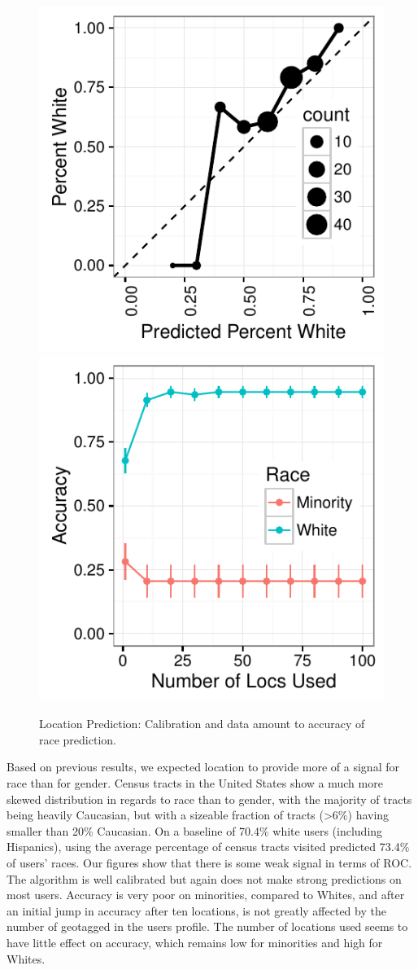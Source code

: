 \begin{figure}
  \centering
    \includegraphics[width=0.48\linewidth]{fig/census/calibration_race_loc-eps-converted-to.pdf}
    \includegraphics[width=0.48\linewidth]{fig/census/locs_v_accuracy_race_labeled-eps-converted-to.pdf}
  \caption{Location Prediction: Calibration and data amount to accuracy of race prediction.\label{fig:accuracy_race_loc}}
\end{figure}

Based on previous results, we expected location to provide more of a signal for race than for gender.
Census tracts in the United States show a much more skewed distribution in regards to race than to gender, with the majority of tracts being heavily Caucasian, but with a sizeable fraction of tracts (>6\%) having smaller than 20\% Caucasian. 
On a baseline of 70.4\% white users (including Hispanics), using the average percentage of census tracts visited predicted 73.4\% of users' races.
Our figures show that there is some weak signal in terms of ROC.
The algorithm is well calibrated but again does not make strong predictions on most users.
Accuracy is very poor on minorities, compared to Whites, and after an initial jump in accuracy after ten locations, is not greatly affected by the number of geotagged in the users profile.
The number of locations used seems to have little effect on accuracy, which remains low for minorities and high for Whites.


